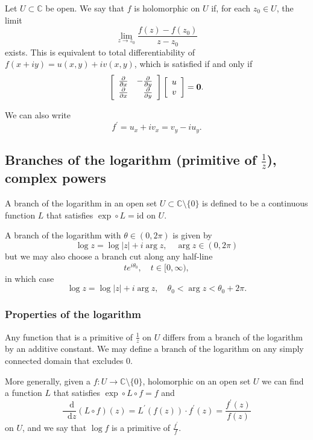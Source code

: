 \documentclass{article}
\newcommand\dif{\mathop{}\!\mathrm{d}}
\begin{document}
Let $U \subset \mathbb{C}$ be open. We say that $f$ is
holomorphic on $U$ if, for each $z_0 \in U$, the limit
$$
  \lim_{z \to z_0}
    \frac{f(z) - f(z_0)}
         {z - z_0}
$$
exists. This is equivalent to total differentiability of
$f(x + i y) = u(x, y) + i v(x, y)$, which is satisfied if and
only if
$$
  \left[
    \begin{array}{r r}
       \frac{\partial}{\partial x}
    & -\frac{\partial}{\partial y} \\
       \frac{\partial}{\partial x}
    &  \frac{\partial}{\partial y}
    \end{array}
  \right]
  \left[
    \begin{array}{c}
      u \\
      v
    \end{array}
  \right]
= \mathbf{0}.
$$

We can also write
$$
f^\prime = u_x + i v_x = v_y - i u_y.
$$

\subsection{Branches of the logarithm (primitive of $\frac{1}{z}$),
                  complex powers}

A branch of the logarithm in an open set
$U \subset \mathbb{C} \setminus \{ 0 \}$ is defined to be
a continuous function $L$ that satisfies
$\exp \circ L = \mathrm{id}$ on $U$.

A branch of the logarithm with $\theta \in (0, 2 \pi)$ is
given by
$$
  \log z
= \log |z| + i \arg z, \quad
  \arg z \in (0, 2 \pi)
$$
but we may also choose a branch cut along any half-line
$$
  t e^{i \theta_0}, \quad
  t \in [0, \infty),
$$
in which case
$$
  \log z
= \log |z| + i \arg z, \quad
  \theta_0 < \arg z < \theta_0 + 2 \pi.
$$

\subsubsection{Properties of the logarithm}
Any function that is a primitive of $\frac{1}{z}$ on $U$
differs from a branch of the logarithm by an additive
constant. We may define a branch of the logarithm on
any simply connected domain that excludes 0.

More generally, given a
$f: U \to \mathbb{C} \setminus \{ 0 \}$,
holomorphic on an open set $U$
we can find a function $L$ that satisfies
$\exp \circ L \circ f = f$ and
$$
  \frac{\dif}{\dif z}
  (L \circ f)(z)
= L^\prime(f(z)) \cdot f^\prime(z)
= \frac{f^\prime(z)}
       {f(z)}
$$
on $U$, and we say that $\log f$ is a primitive of
$\frac{f^\prime}{f}$.
\end{document}
